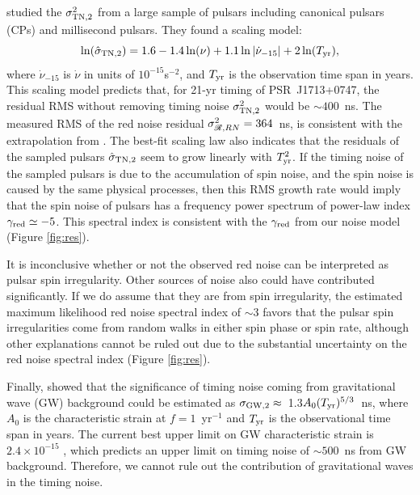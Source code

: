 \citet{sc10} studied the $\sigma^2_{\rm TN,2}$ from a large sample of pulsars
including canonical pulsars (CPs) and millisecond pulsars. They found a scaling
model:
\begin{equation}
\label{eq:sc10}
\ln(\hat{\sigma}_{\rm TN,2}) = 1.6 - 1.4\ln(\nu) +
1.1\ln|\dot{\nu}_{-15}|+2\ln(T_{\rm yr}),
\end{equation}
where $\dot{\nu}_{-15}$ is $\dot{\nu}$ in units of $10^{-15}$s$^{-2}$, and $T_{\rm yr}$
is the observation time span in years.
This scaling model predicts that, for 21-yr timing of PSR~J1713+0747, the
residual RMS without removing timing noise $\sigma^2_{\rm TN,2}$ would be
$\sim400$~ns. The measured RMS of the red noise residual 
$\sigma^2_{\mathscr{R},RN}=364$~ns, is consistent with the extrapolation
from \citet{sc10}.  
The best-fit scaling law also indicates that the residuals of the
sampled pulsars $\hat{\sigma}_{\rm TN,2}$ seem to grow linearly with $T_{\rm yr}^2$. 
If the timing noise of the sampled pulsars is due to the accumulation of 
spin noise, and the spin noise is caused by the same physical processes,
then this RMS growth rate would imply that the spin noise of pulsars has a
frequency power spectrum of power-law index $\gamma_{\rm red}\simeq -5$. This 
spectral index is consistent with the $\gamma_{\rm red}$
from our noise model (Figure \ref{fig:res}).

It is inconclusive whether or not the observed red noise can be interpreted as pulsar spin irregularity.
Other sources of noise also could have contributed significantly.
If we do assume that they are from spin irregularity, 
the estimated maximum likelihood red noise spectral index of $\sim3$ 
favors that the pulsar spin irregularities come from
random walks in either spin phase or spin rate, although other explanations cannot be ruled out due to the
substantial uncertainty on the red noise spectral index (Figure \ref{fig:res}).

Finally, \citet{sc10} showed that the significance of timing noise coming from
gravitational wave (GW) background could be estimated as
$\sigma_{\rm GW,2} \approx$~1.3$A_0(T_{\rm yr})^{5/3}$~ns, where $A_0$ is the
characteristic strain at $f=1$~yr$^{-1}$ and $T_{\rm yr}$ is the observational
time span in years. The current best upper limit on GW characteristic 
strain is $2.4\times10^{-15}$ \citep{src+13}, which predicts an upper limit on
timing noise of $\sim500$~ns from GW background. Therefore, we
cannot rule out the contribution of gravitational waves in the timing noise.


